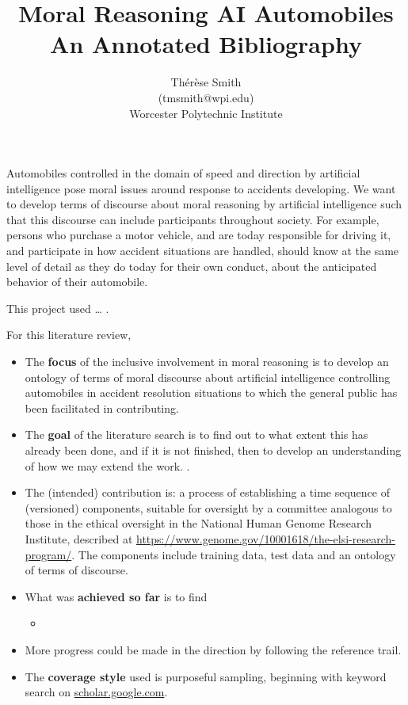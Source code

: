 \documentclass [11pt]{article}
\title{Moral Reasoning AI Automobiles\\\medskip An Annotated Bibliography}
\author{Th\'er\`ese Smith\\ (tmsmith@wpi.edu)\\Worcester Polytechnic Institute}
\begin{document}
\maketitle

Automobiles controlled in the domain of speed and direction by artificial intelligence pose moral issues around response to accidents developing.
We want to develop terms of discourse about moral reasoning by artificial intelligence such that this discourse can include participants throughout society. For example, persons who purchase a motor vehicle, and are today responsible for driving it, and participate in how accident situations are handled, should know at the same level of detail as they do today for their own conduct, about the anticipated behavior of their automobile.

This project used  \ldots
.

For this literature review, 
\begin{itemize}
\item The \textbf{focus} of the inclusive involvement in moral reasoning is to develop an ontology of terms of moral discourse about artificial intelligence controlling automobiles in accident resolution situations to which the general public has been facilitated in contributing.

\item The \textbf{goal} of the literature search is to find out to what extent this has already been done, and if it is not finished, then to develop an understanding of how we may extend the work.
.
\item The (intended)
contribution is:
a process of establishing a time sequence of (versioned) components, suitable for oversight by a committee analogous to those in the ethical oversight in the National Human Genome Research Institute, described at \url{https://www.genome.gov/10001618/the-elsi-research-program/}. The components include training data, test data and an ontology of terms of discourse.


\item What was \textbf{achieved so far} is to find 
\begin{itemize}
	\item  
\end{itemize}
\item More progress could be made in the direction by following the reference trail.
\item The \textbf{coverage style} used is purposeful sampling, beginning with keyword search on \url{scholar.google.com}.
\end{itemize}
\end{document}
